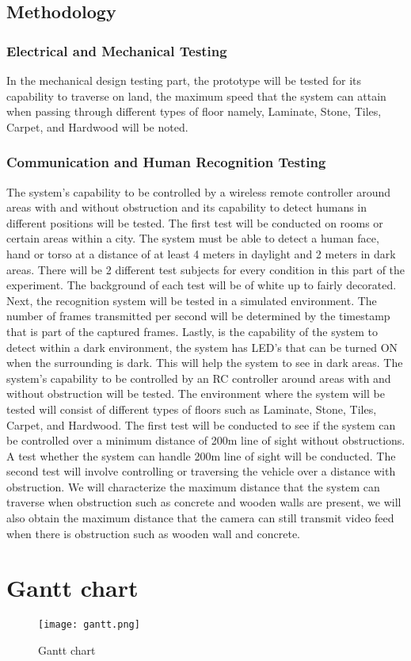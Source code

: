 \subsection{Methodology}
\subsubsection{Electrical and Mechanical Testing}
In the mechanical design testing part, the prototype will be tested for its capability to traverse on land, the maximum speed that the system can attain when passing through different types of floor namely, Laminate, Stone, Tiles, Carpet, and Hardwood will be noted.

\subsubsection{Communication and Human Recognition Testing}
The system’s capability to be controlled by a wireless remote controller around areas with and without obstruction and its capability to detect humans in different positions will be tested. The first test will be conducted on rooms or certain areas within a city. The system must be able to detect a human face, hand or torso at a distance of at least 4 meters in daylight and 2 meters in dark areas. There will be 2 different test subjects for every condition in this part of the experiment. The background of each test will be of white up to fairly decorated.
Next, the recognition system will be tested in a simulated environment. The number of frames transmitted per second will be determined by the timestamp that is part of the captured frames. Lastly, is the capability of the system to detect within a dark environment, the system has LED’s that can be turned ON when the surrounding is dark. This will help the system to see in dark areas.
The system’s capability to be controlled by an RC controller around areas with and without obstruction will be tested. The environment where the system will be tested will consist of different types of floors such as Laminate, Stone, Tiles, Carpet, and Hardwood. The first test will be conducted to see if the system can be controlled over a minimum distance of 200m line of sight without obstructions. A test whether the system can handle 200m line of sight will be conducted. The second test will involve controlling or traversing the vehicle over a distance with obstruction. We will characterize the maximum distance that the system can traverse when obstruction such as concrete and wooden walls are present, we will also obtain the maximum distance that the camera can still transmit video feed when there is obstruction such as wooden wall and concrete.

\section{Gantt chart}
\begin{figure}[h]
	\centering
		\texttt{[image: gantt.png]}
	\caption{Gantt chart}
	\label{fig:gantt}
\end{figure}
